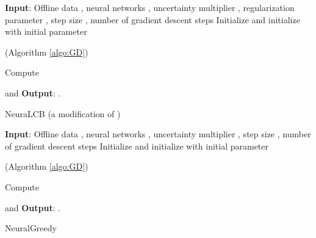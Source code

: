 \documentclass{article} \usepackage{iclr2023/iclr2023_conference,times}
\begin{document}
\begin{algorithm}[h]
\begin{algorithmic}[1]
\State \textbf{Input}: Offline data , neural networks , uncertainty multiplier , regularization parameter , step size , number of gradient descent steps   
\State Initialize  and initialize  with initial parameter 
\For{}


\State  (Algorithm \ref{algo:GD})


\State 



\State Compute 






\State  and 
\EndFor
\State \textbf{Output}: .
\end{algorithmic}
\caption{NeuraLCB (a modification of \citep{nguyen2021offline})}
\label{algorithm: NeuraLCB}
\end{algorithm}


\begin{algorithm}
\begin{algorithmic}[1]
\State \textbf{Input}: Offline data , neural networks , uncertainty multiplier , step size , number of gradient descent steps   
\State Initialize  and initialize  with initial parameter 
\For{}


\State  (Algorithm \ref{algo:GD})






\State Compute 






\State  and 
\EndFor
\State \textbf{Output}: .
\end{algorithmic}
\caption{NeuralGreedy}
\label{algorithm: NeuralGreedy}
\end{algorithm}

 
\end{document}
